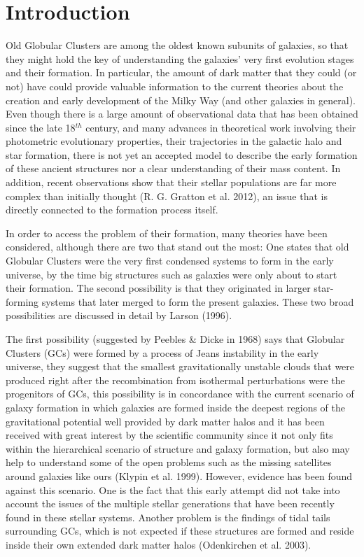 \chapter{Introduction}

Old Globular Clusters are among the oldest known subunits of galaxies, so that they might hold the key of understanding the galaxies' very first evolution stages and their formation. In particular, the amount of dark matter that they could (or not) have could provide valuable information to the current theories about the creation and early development of the Milky Way (and other galaxies in general). Even though there is a large amount of observational data that has been obtained since the late 18$^{th}$ century, and many advances in theoretical work involving their photometric evolutionary properties, their trajectories in the galactic halo and star formation, there is not yet an accepted model to describe the early formation of these ancient structures nor a clear understanding of their mass content. In addition, recent observations show that their stellar populations are far more complex than initially thought (R. G. Gratton et al. 2012), an issue that is directly connected to the formation process itself. 

In order to access the problem of their formation, many theories have been considered, although there are two that stand out the most: One states that old Globular Clusters were the very first condensed systems to form in the early universe, by the time big structures such as galaxies were only about to start their formation. The second possibility is that they originated in larger star-forming systems that later merged to form the present galaxies. These two broad possibilities are discussed in detail by Larson (1996).

The first possibility (suggested by Peebles \& Dicke in 1968) says that Globular Clusters (GCs) were formed by a process of Jeans instability in the early universe, they suggest that the smallest gravitationally unstable clouds that were produced right after the recombination from isothermal perturbations were the progenitors of GCs, this possibility is in concordance with the current scenario of galaxy formation in which galaxies are formed inside the deepest regions of the gravitational potential well provided by dark matter halos and it has been received with great interest by the scientific community since it not only fits within the hierarchical scenario of structure and galaxy formation, but also may help to understand some of the open problems such as the missing satellites around galaxies like ours (Klypin et al. 1999). However, evidence has been found against this scenario. One is the fact that this early attempt did not take into account the issues of the multiple stellar generations that have been recently found in these stellar systems. Another problem is the findings of tidal tails surrounding GCs, which is not expected if these structures are formed and reside inside their own extended dark matter halos (Odenkirchen et al. 2003).

